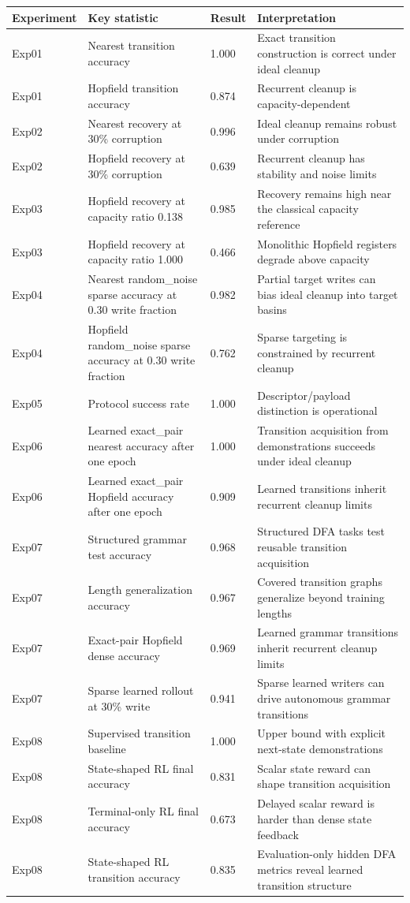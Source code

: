 \begin{tabular}{llll}
\toprule
Experiment & Key statistic & Result & Interpretation \\
\midrule
Exp01 & Nearest transition accuracy & 1.000 & Exact transition construction is correct under ideal cleanup \\
Exp01 & Hopfield transition accuracy & 0.874 & Recurrent cleanup is capacity-dependent \\
Exp02 & Nearest recovery at 30\% corruption & 0.996 & Ideal cleanup remains robust under corruption \\
Exp02 & Hopfield recovery at 30\% corruption & 0.639 & Recurrent cleanup has stability and noise limits \\
Exp03 & Hopfield recovery at capacity ratio 0.138 & 0.985 & Recovery remains high near the classical capacity reference \\
Exp03 & Hopfield recovery at capacity ratio 1.000 & 0.466 & Monolithic Hopfield registers degrade above capacity \\
Exp04 & Nearest random\_noise sparse accuracy at 0.30 write fraction & 0.982 & Partial target writes can bias ideal cleanup into target basins \\
Exp04 & Hopfield random\_noise sparse accuracy at 0.30 write fraction & 0.762 & Sparse targeting is constrained by recurrent cleanup \\
Exp05 & Protocol success rate & 1.000 & Descriptor/payload distinction is operational \\
Exp06 & Learned exact\_pair nearest accuracy after one epoch & 1.000 & Transition acquisition from demonstrations succeeds under ideal cleanup \\
Exp06 & Learned exact\_pair Hopfield accuracy after one epoch & 0.909 & Learned transitions inherit recurrent cleanup limits \\
Exp07 & Structured grammar test accuracy & 0.968 & Structured DFA tasks test reusable transition acquisition \\
Exp07 & Length generalization accuracy & 0.967 & Covered transition graphs generalize beyond training lengths \\
Exp07 & Exact-pair Hopfield dense accuracy & 0.969 & Learned grammar transitions inherit recurrent cleanup limits \\
Exp07 & Sparse learned rollout at 30\% write & 0.941 & Sparse learned writers can drive autonomous grammar transitions \\
Exp08 & Supervised transition baseline & 1.000 & Upper bound with explicit next-state demonstrations \\
Exp08 & State-shaped RL final accuracy & 0.831 & Scalar state reward can shape transition acquisition \\
Exp08 & Terminal-only RL final accuracy & 0.673 & Delayed scalar reward is harder than dense state feedback \\
Exp08 & State-shaped RL transition accuracy & 0.835 & Evaluation-only hidden DFA metrics reveal learned transition structure \\
\bottomrule
\end{tabular}
